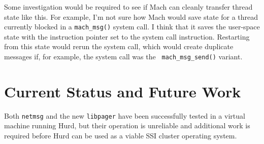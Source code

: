 \documentclass{article}
\def\libpager{{\tt libpager}\xspace}
\def\netmsg{{\tt netmsg}\xspace}
\begin{document}
Some investigation would be required to see if Mach can cleanly
transfer thread state like this.  For example, I'm not sure how Mach
would save state for a thread currently blocked in a {\tt mach_msg()}
system call.  I think that it saves the user-space state with the
instruction pointer set to the system call instruction.  Restarting
from this state would rerun the system call, which would create
duplicate messages if, for example, the system call was the {\tt
  mach_msg_send()} variant.

\section{Current Status and Future Work}

Both \netmsg and the new \libpager have been successfully
tested in a virtual machine running Hurd, but their operation
is unreliable and additional work is
required before Hurd can be used as a viable SSI cluster operating
system.
\end{document}
